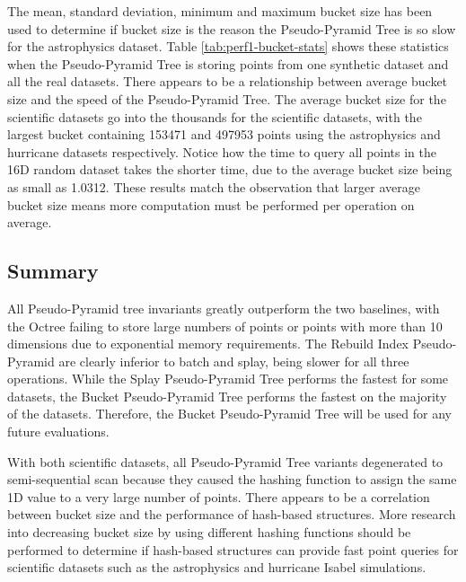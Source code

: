 The mean, standard deviation, minimum and maximum bucket size has been used to determine if bucket size is the reason the Pseudo-Pyramid Tree is so slow for the astrophysics dataset. Table \ref{tab:perf1-bucket-stats} shows these statistics when the Pseudo-Pyramid Tree is storing points from one synthetic dataset and all the real datasets. There appears to be a relationship between average bucket size and the speed of the Pseudo-Pyramid Tree. The average bucket size for the scientific datasets go into the thousands for the scientific datasets, with the largest bucket containing 153471 and 497953 points using the astrophysics and hurricane datasets respectively. Notice how the time to query all points in the 16D random dataset takes the shorter time, due to the average bucket size being as small as 1.0312. These results match the observation that larger average bucket size means more computation must be performed per operation on average.

\subsection{Summary}

All Pseudo-Pyramid tree invariants greatly outperform the two baselines, with the Octree failing to store large numbers of points or points with more than 10 dimensions due to exponential memory requirements. The Rebuild Index Pseudo-Pyramid are clearly inferior to batch and splay, being slower for all three operations. While the Splay Pseudo-Pyramid Tree performs the fastest for some datasets, the Bucket Pseudo-Pyramid Tree performs the fastest on the majority of the datasets. Therefore, the Bucket Pseudo-Pyramid Tree will be used for any future evaluations.

With both scientific datasets, all Pseudo-Pyramid Tree variants degenerated to semi-sequential scan because they caused the hashing function to assign the same 1D value to a very large number of points. There appears to be a correlation between bucket size and the performance of hash-based structures. More research into decreasing bucket size by using different hashing functions should be performed to determine if hash-based structures can provide fast point queries for scientific datasets such as the astrophysics and hurricane Isabel simulations.